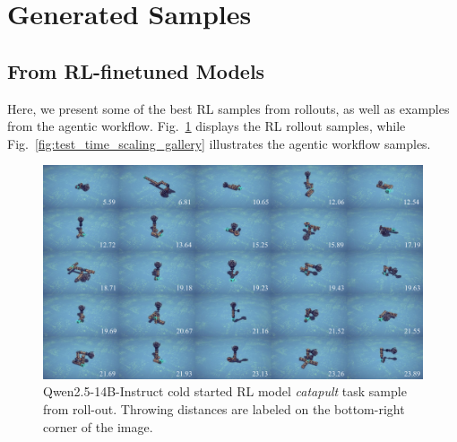 \clearpage
\newpage
\section{Generated Samples}

\subsection{From RL-finetuned Models}
Here, we present some of the best RL samples from rollouts, as well as examples from the agentic workflow. Fig.~\ref{fig:RL_best_sample} displays the RL rollout samples, while Fig.~\ref{fig:test_time_scaling_gallery} illustrates the agentic workflow samples. 

\begin{figure}[h!]
  \centering
  \includegraphics[width=\linewidth]{figures/RL_sample_new_v2.pdf}
  \caption{\footnotesize Qwen2.5-14B-Instruct cold started RL model \textit{catapult} task sample from roll-out. Throwing distances are labeled on the bottom-right corner of the image.}
  \label{fig:RL_best_sample}
\end{figure}

\newpage
